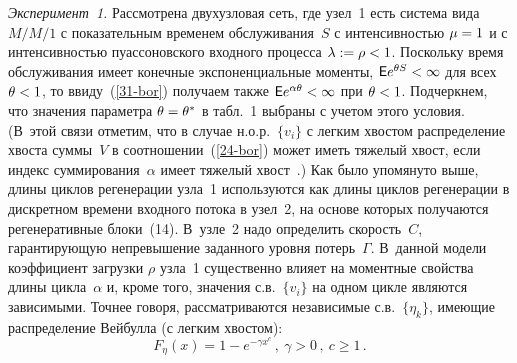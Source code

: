 \begin{multicols}{2}
{\it Эксперимент~1.} Рассмотрена  двухузловая   сеть, где узел~1
есть система вида $M/M/1$ с показательным  временем обслуживания~$S$
с интенсивностью $\mu\hm= 1$ и с интенсивностью  пуассоновского
входного процесса $\lambda:=\rho\hm<1$. Поскольку время обслуживания
имеет конечные экспоненциальные моменты, $\e e^{\theta S}\hm<\infty$
для всех $\theta\hm<1$, то ввиду~(\ref{31-bor}) получаем также $\e
e^{\alpha \theta }\hm<\infty $ при $\theta\hm<1$. Подчеркнем, что значения
параметра $\theta\hm=\theta^*$ в табл.~1 выбраны с учетом этого
условия. (В~этой связи отметим, что в случае н.о.р.\ $\{v_i\}$ с
легким хвостом распределение хвоста суммы~$V$ в соотношении~(\ref{24-bor}) 
может иметь тяжелый хвост,  если индекс суммирования~$\alpha$ имеет тяжелый хвост~\cite{HT}.) 
Как было упомянуто выше,
длины цик\-лов регенерации  узла~1 используются  как длины циклов
регенерации в дискретном времени входного потока в узел~2, на основе
которых получаются регенеративные блоки~(14). В~узле~2
надо определить скорость~$C$, гарантирующую  непревышение заданного
уровня потерь~$\Gamma$.  В~данной модели коэффициент загрузки $\rho$
узла~1 существенно влияет на моментные свойства длины цикла~$\alpha$
и, кроме того,  значения с.в.\ $\{v_i\}$ на одном цикле являются
зависимыми. Точнее говоря, рассматриваются  независимые с.в.\
$\{\eta_k\}$, имеющие распределение Вейбулла (с легким хвостом):
\begin{equation*}
F_\eta (x) = 1 - e^{-\gamma x^c}\,, \ \gamma > 0\,, \ c \ge 1\,.
\end{equation*}

\begin{table*}\small
\begin{center}
\vspace*{2ex}


\end{center}
\end{table*}
\end{multicols}
